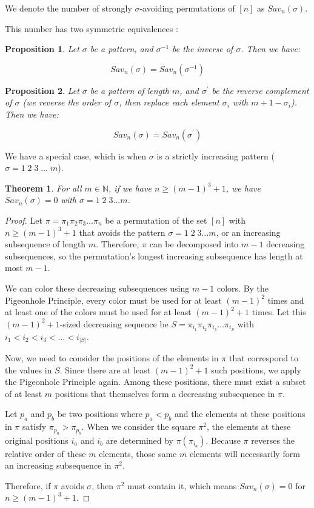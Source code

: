 \documentclass[12pt]{article}
\newtheorem{prop}{Proposition}   %
\newtheorem{thm}{Theorem} %
\begin{document}
We denote the number of strongly $\sigma$-avoiding permutations of $[n]$ as $Sav_n(\sigma)$.

This number has two symmetric equivalences \cite{Bona2019}:

\begin{prop} Let $\sigma$ be a pattern, and $\sigma^{-1}$ be the inverse of $\sigma$. Then we have:

$$Sav_n(\sigma)=Sav_n(\sigma^{-1})$$
\end{prop}

\begin{prop} Let $\sigma$ be a pattern of length $m$, and $\sigma^{'}$ be the reverse complement of $\sigma$ (we reverse the order of $\sigma$, then replace each element $\sigma_i$ with $m+1-\sigma_i$). Then we have:

$$Sav_n(\sigma)=Sav_n(\sigma^{'})$$
\end{prop}

We have a special case, which is when $\sigma$ is a strictly increasing pattern ($\sigma = 1\;2\;3\;\ldots\;m$).
\begin{thm}
    For all $m \in \mathbb{N}$, if we have $n \geq (m - 1)^3 + 1$, we have $Sav_n(\sigma) = 0$ with $\sigma = 1\;2\;3\ldots m$.
\end{thm}

\begin{proof} 
Let $\pi = \pi_1\pi_2\pi_3\ldots\pi_n$ be a permutation of the set $[n]$ with $n \geq (m-1)^3 + 1$ that avoids the pattern $\sigma = 1\;2\;3\ldots m$, or an increasing subsequence of length $m$. Therefore, $\pi$ can be decomposed into $m-1$ decreasing subsequences, so the permutation's longest increasing subsequence has length at most $m-1$.

We can color these decreasing subsequences using $m-1$ colors. By the Pigeonhole Principle, every color must be used for at least $(m-1)^2$ times and at least one of the colors must be used for at least $(m-1)^2+1$ times. Let this $(m-1)^2+1$-sized decreasing sequence be $S = \pi_{i_1}\pi_{i_2}\pi_{i_3}\ldots\pi_{i_{S}}$ with $i_1 < i_2 < i_3 < \ldots < i_{|S|}$.

Now, we need to consider the positions of the elements in $\pi$ that correspond to the values in $S$. Since there are at least $(m-1)^2+1$ such positions, we apply the Pigeonhole Principle again. Among these positions, there must exist a subset of at least $m$ positions that themselves form a decreasing subsequence in $\pi$.  

Let $p_a$ and $p_b$ be two  positions where $p_a < p_b$ and the elements at these positions in $\pi$ satisfy $\pi_{p_a} > \pi_{p_b}$. When we consider the square $\pi^2$, the elements at these original positions $i_a$ and $i_b$ are determined by $\pi(\pi_{i_a})$. Because $\pi$ reverses the relative order of these $m$ elements, those same $m$ elements will necessarily form an increasing subsequence in $\pi^2$.

Therefore, if $\pi$ avoids $\sigma$, then $\pi^2$ must contain it, which means $Sav_{n}(\sigma)=0$ for $n \geq (m-1)^3 + 1$. 
\end{proof} 
\end{document}
